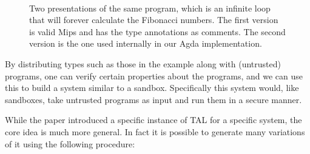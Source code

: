 \begin{figure}
\begin{code}
  \\
  \>[2]\<[5]%
  \>[5] \AgdaInductiveConstructor{$\Lambda$} \AgdaInductiveConstructor{[]}     \AgdaInductiveConstructor{$\alpha$} \AgdaSymbol{(} \AgdaSymbol{)}  \AgdaInductiveConstructor{$\alpha$} \AgdaSymbol{(} \AgdaSymbol{)}  \AgdaInductiveConstructor{$\rho$} \AgdaSymbol{(} \AgdaSymbol{)}  \AgdaInductiveConstructor{[]} \<%
\end{code}
\caption{Two presentations of the same program, which is an infinite loop that
    will forever calculate the Fibonacci numbers. The first version is valid Mips
    and has the type annotations as comments. The second version is the one used
    internally in our Agda implementation.}
  \label{fig:example}
\end{figure}

By distributing types such as those in the example along with (untrusted)
programs, one can verify certain properties about the programs, and we can use
this to build a system similar to a sandbox. Specifically this system would,
like sandboxes, take untrusted programs as input and run them in a secure
manner.

While the paper introduced a specific instance of TAL for a specific system, the
core idea is much more general. In fact it is possible to generate many
variations of it using the following procedure:

